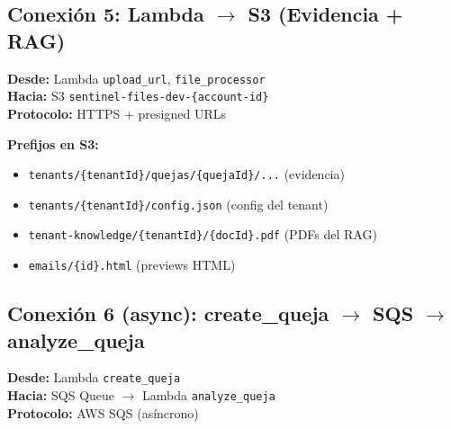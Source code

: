 \documentclass[11pt,a4paper]{article}
\begin{document}
\subsection{Conexi\'on 5: Lambda $\rightarrow$ S3 (Evidencia + RAG)}

\begin{tcolorbox}[colback=green!5, colframe=awsgreen, title=\textbf{Desde $\rightarrow$ Hasta}]
\textbf{Desde:} Lambda \texttt{upload\_url}, \texttt{file\_processor} \\
\textbf{Hacia:} S3 \texttt{sentinel-files-dev-\{account-id\}} \\
\textbf{Protocolo:} HTTPS + presigned URLs
\end{tcolorbox}

\begin{center}
\end{center}

\textbf{Prefijos en S3:}
\begin{itemize}[leftmargin=*]
  \item \texttt{tenants/\{tenantId\}/quejas/\{quejaId\}/...} (evidencia)
  \item \texttt{tenants/\{tenantId\}/config.json} (config del tenant)
  \item \texttt{tenant-knowledge/\{tenantId\}/\{docId\}.pdf} (PDFs del RAG)
  \item \texttt{emails/\{id\}.html} (previews HTML)
\end{itemize}

\subsection{Conexi\'on 6 (async): create\_queja $\rightarrow$ SQS $\rightarrow$ analyze\_queja}

\begin{tcolorbox}[colback=orange!5, colframe=awsorange, title=\textbf{Desde $\rightarrow$ Hasta (ASYNC)}]
\textbf{Desde:} Lambda \texttt{create\_queja} \\
\textbf{Hacia:} SQS Queue $\rightarrow$ Lambda \texttt{analyze\_queja} \\
\textbf{Protocolo:} AWS SQS (as\'incrono)
\end{tcolorbox}
\end{document}
